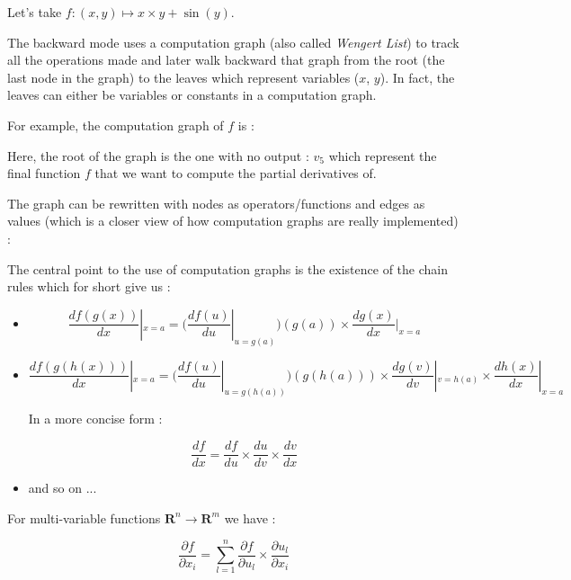\documentclass[12pt]{article}
\begin{document}
Let's take $f: (x,y) \mapsto x \times y + \sin(y) $.

\bigskip

The backward mode uses a computation graph (also called {\it Wengert List}) to track all the operations made and later walk backward that graph from the root (the last node in the graph) to the leaves which represent variables ($x$, $y$). In fact, the leaves can either be variables or constants in a computation graph.

For example, the computation graph of $f$ is :

\begin{figure}[H]
 \centering
 
\end{figure}

Here, the root of the graph is the one with no output : $v_5$ which represent the final function $f$ that we want to compute the partial derivatives of.

\bigskip 

The graph can be rewritten with nodes as operators/functions and edges as values (which is a closer view of how computation graphs are really implemented) : 

\begin{figure}[H]
 \centering
 
\end{figure}


The central point to the use of computation graphs is the existence of the chain rules \cite{wiki_chain_rules} which for short give us :

\begin{itemize}
    \item 
$$
\frac{df(g(x))}{dx}|_{x=a}= \big( \frac{df(u)}{du}|_{u=g(a)} \big)(g(a)) \times \frac{dg(x)}{dx}|_{x=a}
$$
    \item 
$$
\frac{df(g(h(x)))}{dx}|_{x=a}= \big( \frac{df(u)}{du}|_{u=g(h(a))} \big)(g(h(a))) \times \frac{dg(v)}{dv}|_{v=h(a)} \times \frac{dh(x)}{dx}|_{x=a}
$$

In a more concise form : 

$$
\frac{df}{dx} = \frac{df}{du} \times \frac{du}{dv} \times \frac{dv}{dx}
$$

    \item and so on ...
\end{itemize}

For multi-variable functions $\mathbf{R}^n \rightarrow \mathbf{R}^m$ we have :

$$
\frac{\partial{f}}{\partial{x_i}} = \sum_{l=1}^{n} \frac{\partial{f}}{\partial{u_l}} \times  \frac{\partial{u_l}}{\partial{x_i}}
$$
\end{document}
